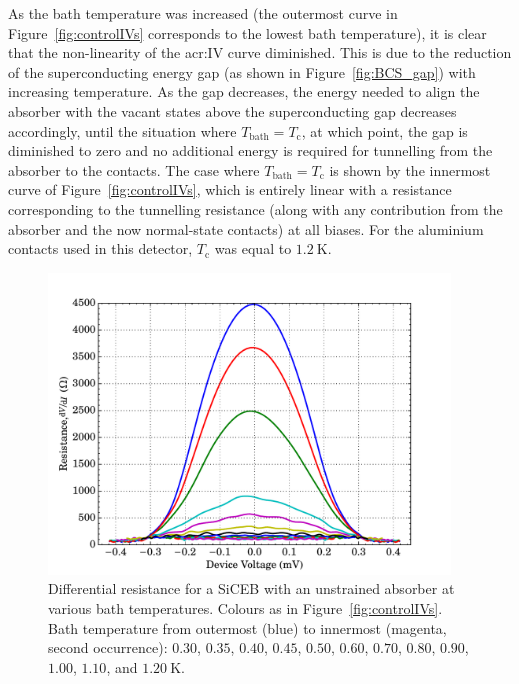 \par 
As the bath temperature was increased (the outermost curve in Figure~\ref{fig:controlIVs} corresponds to the lowest bath temperature), it is clear that the non-linearity of the \gls{acr:IV} curve diminished. This is due to the reduction of the superconducting energy gap (as shown in Figure~\ref{fig:BCS_gap}) with increasing temperature. As the gap decreases, the energy needed to align the absorber with the vacant states above the superconducting gap decreases accordingly, until the situation where $T_{\mathrm{bath}} = T_{\mathrm{c}}$, at which point, the gap is diminished to zero and no additional energy is required for tunnelling from the absorber to the contacts. The case where $T_{\mathrm{bath}} = T_{\mathrm{c}}$ is shown by the innermost curve of Figure~\ref{fig:controlIVs}, which is entirely linear with a resistance corresponding to the tunnelling resistance (along with any contribution from the absorber and the now normal-state contacts) at all biases. For the aluminium contacts used in this detector, $T_{\mathrm{c}}$ was equal to $1.2~\mathrm{K}$.
\par 
\begin{figure}[tb]
\begin{center}
\includegraphics[width = 0.95\textwidth]{figures/control_Rderiv}
\caption[Differential resistance for a SiCEB with an unstrained absorber]{Differential resistance for a SiCEB with an unstrained absorber at various bath temperatures. Colours as in Figure~\ref{fig:controlIVs}. Bath temperature from outermost (blue) to innermost (magenta, second occurrence): $0.30$, $0.35$, $0.40$, $0.45$, $0.50$, $0.60$, $0.70$, $0.80$, $0.90$, $1.00$, $1.10$, and $1.20~\mathrm{K}$.}
\label{fig:controlRderiv}
\end{center}
\end{figure}
